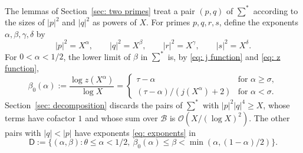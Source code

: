 \documentclass{article}
\numberwithin{equation}{section}
\newcommand{\Le}{\leqslant}
\newcommand{\Ge}{\geqslant}
\begin{document}
The lemmas of Section~\ref{sec: two primes} treat a pair $(p, q)$ of $\sum^*$ according to the sizes of $|p|^2$ and $|q|^2$ as powers of $X$. For primes $p, q, r, s$, define the exponents $\alpha, \beta, \gamma, \delta$ by
\begin{equation}
\label{eq: exponents}
|p|^2 = X^{\alpha}, \qquad |q|^2 = X^{\beta}, \qquad |r|^2 = X^{\gamma}, \qquad |s|^2 = X^{\delta}.
\end{equation}
For $0 < \alpha < 1/2$, the lower limit of $\beta$ in $\sum^*$ is, by \eqref{eq: j function} and \eqref{eq: z function},
\begin{equation}
\label{eq: beta0}
\beta_0(\alpha) := \frac{\log z(X^{\alpha})}{\log X} = \begin{cases} \tau - \alpha & \text{for } \alpha \Ge \sigma, \\ (\tau - \alpha)/(j(X^{\alpha}) + 2) & \text{for } \alpha < \sigma. \end{cases}
\end{equation}
Section~\ref{sec: decomposition} discards the pairs of $\sum^*$ with $|p|^2|q|^4 \Ge X$, whose terms have cofactor $1$ and whose sum over $\mathcal{B}$ is $\mathcal{O}(X/(\log X)^2)$. The other pairs with $|q| < |p|$ have exponents \eqref{eq: exponents} in
\begin{equation}
\label{eq: domain}
\mathsf{D} := \bigl\{ (\alpha, \beta) : \theta \Le \alpha < 1/2,\ \beta_0(\alpha) \Le \beta < \min(\alpha, (1 - \alpha)/2) \bigr\}.
\end{equation}
\end{document}
